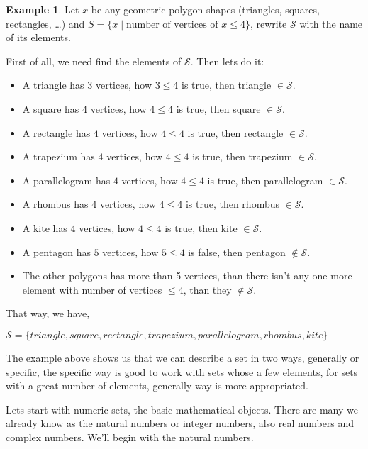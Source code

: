 \documentclass[11pt, a4paper]{amsart}
\numberwithin{equation}{section}
\theoremstyle{plain} %
\theoremstyle{definition}
\newtheorem{ex}{Example}[section]
\theoremstyle{remark}
\begin{document}
\begin{ex}
Let $x$ be any geometric polygon shapes (triangles, squares, rectangles, \dots) and $S=\lbrace x \mid \text{number of vertices of }x \leq 4\rbrace$, rewrite $\mathcal{S}$ with the name of its elements.

First of all, we need find the elements of $\mathcal{S}$. Then lets do it:
\begin{itemize}
  \item A triangle has $3$ vertices, how $3\leq4$ is true, then triangle $\in \mathcal{S}$.
  \item A square has $4$ vertices, how $4\leq4$ is true, then square $\in \mathcal{S}$.
  \item A rectangle has $4$ vertices, how $4\leq4$ is true, then rectangle $\in \mathcal{S}$.
  \item A trapezium has $4$ vertices, how $4\leq4$ is true, then trapezium $\in \mathcal{S}$.
  \item A parallelogram has $4$ vertices, how $4\leq4$ is true, then parallelogram $\in \mathcal{S}$.
  \item A rhombus has $4$ vertices, how $4\leq4$ is true, then rhombus $\in \mathcal{S}$.
  \item A kite has $4$ vertices, how $4\leq4$ is true, then kite $\in \mathcal{S}$.
  \item A pentagon has $5$ vertices, how $5\leq4$ is false, then pentagon $\notin\mathcal{S}$.
  \item The other polygons has more than 5 vertices, than there isn't any one more element with number of vertices $\leq4$, than they $\notin\mathcal{S}$.
\end{itemize}

That way, we have,
\begin{center}
    $\mathcal{S}=\lbrace\textit{triangle}, \textit{square}, \textit{rectangle}, \textit{trapezium}, \textit{parallelogram}, \textit{rhombus}, \textit{kite}\rbrace$
\end{center}
\end{ex}
The example above shows us that we can describe a set in two ways, generally or specific, the specific way is good to work with sets whose a few elements, for sets with a great number of elements, generally way is more appropriated.

Lets start with numeric sets, the basic mathematical objects. There are many we already know as the natural numbers or integer numbers, also real numbers and complex numbers. We'll begin with the natural numbers.
\end{document}
